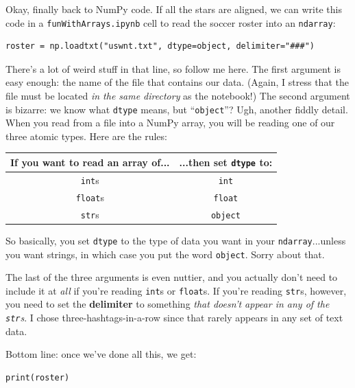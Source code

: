 Okay, finally back to NumPy code. If all the stars are aligned, we can write
this code in a \texttt{funWithArrays.ipynb} cell to read the soccer roster into
an \texttt{ndarray}:

\begin{Verbatim}[fontsize=\small,samepage=true,frame=single,framesep=3mm]
roster = np.loadtxt("uswnt.txt", dtype=object, delimiter="###")
\end{Verbatim}

There's a lot of weird stuff in that line, so follow me here. The first
argument is easy enough: the name of the file that contains our data. (Again, I
stress that the file must be located \textit{in the same directory} as the
notebook!) The second argument is bizarre: we know what \texttt{dtype} means,
but ``\texttt{object}''? Ugh, another fiddly detail. When you read from a file
into a NumPy array, you will be reading one of our three atomic types. Here are
the rules:

\label{dtypeRules}
\begin{center}
\begin{tabular}{c|c}
If you want to read an array of... & ...then set \texttt{dtype} to: \\
\hline
\texttt{int}s & \texttt{int} \\
\texttt{float}s & \texttt{float} \\
\texttt{str}s & \texttt{object} \\
\end{tabular}
\end{center}

So basically, you set \texttt{dtype} to the type of data you want in your
\texttt{ndarray}...unless you want strings, in which case you put the word
\texttt{object}. Sorry about that.


The last of the three arguments is even nuttier, and you actually don't need to
include it at \textit{all} if you're reading \texttt{int}s or \texttt{float}s.
If you're reading \texttt{str}s, however, you need to set the
\textbf{delimiter} to something \textit{that doesn't appear in any of the
\texttt{str}s}. I chose three-hashtags-in-a-row since that rarely appears in
any set of text data.

Bottom line: once we've done all this, we get:

\begin{Verbatim}[fontsize=\small,samepage=true,frame=single,framesep=3mm]
print(roster)
\end{Verbatim}

